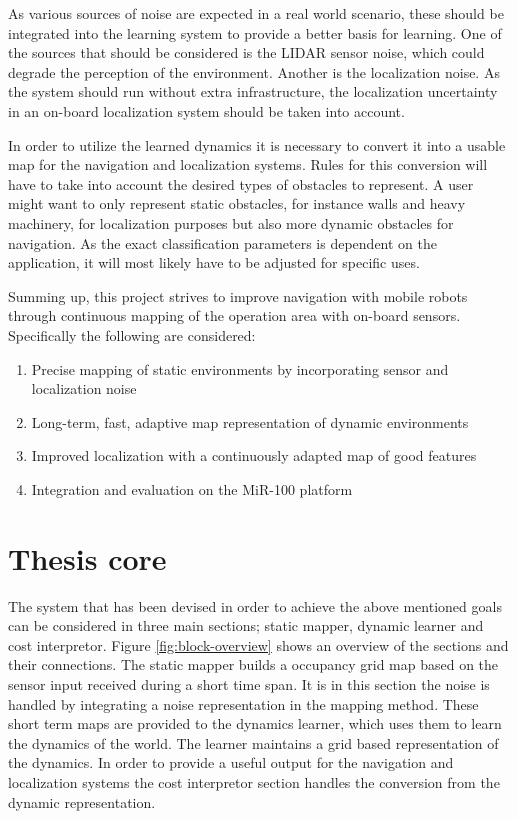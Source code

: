  
As various sources of noise are expected in a real world scenario, these should be integrated into the learning system to provide a better basis for learning. One of the sources that should be considered is the LIDAR sensor noise, which could degrade the perception of the environment. 
Another is the localization noise.
As the system should run without extra infrastructure, the localization uncertainty in an on-board localization system should be taken into account.

In order to utilize the learned dynamics it is necessary to convert it into a usable map for the navigation and localization systems. Rules for this conversion will have to take into account the desired types of obstacles to represent. 
A user might want to only represent static obstacles, for instance walls and heavy machinery, for localization purposes but also more dynamic obstacles for navigation. 
As the exact classification parameters is dependent on the  application, it will most likely have to be adjusted for specific uses. 

Summing up, this project strives to improve navigation with mobile robots through continuous mapping of the operation area with on-board sensors. 
Specifically the following are considered:
\begin{enumerate}
    \item Precise mapping of static environments by incorporating sensor and localization noise
    \item Long-term, fast, adaptive map representation of dynamic environments
    \item Improved localization with a continuously adapted map of good features
    \item Integration and evaluation on the MiR-100 platform
\end{enumerate}

\section{Thesis core}
The system that has been devised in order to achieve the above mentioned goals can be considered in three main sections; static mapper, dynamic learner and cost interpretor. 
Figure \ref{fig:block-overview} shows an overview of the sections and their connections. 
The static mapper builds a occupancy grid map based on the sensor input received during a short time span. It is in this section the noise is handled by integrating a noise representation in the mapping method.
These short term maps are provided to the dynamics learner, which uses them to learn the dynamics of the world. The learner maintains a grid based representation of the dynamics. 
In order to provide a useful output for the navigation and localization systems the cost interpretor section handles the conversion from the dynamic representation. 

